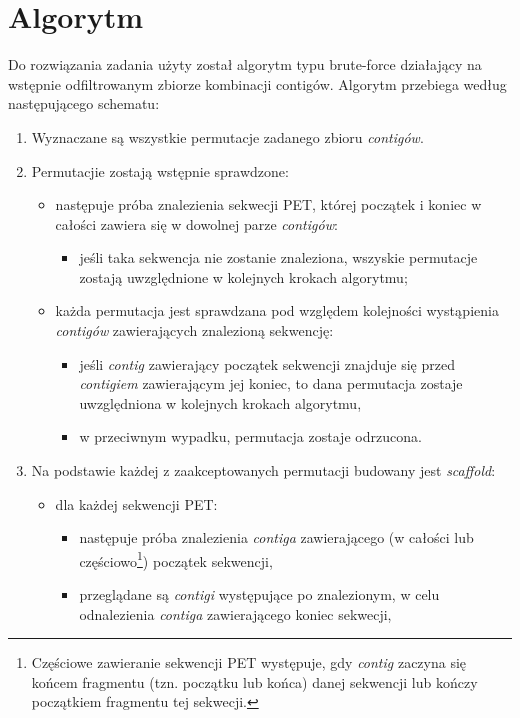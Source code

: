\documentclass[a4paper,10pt]{article}
\begin{document}
\section*{Algorytm}

Do rozwiązania zadania użyty został algorytm typu brute-force działający na wstępnie odfiltrowanym zbiorze kombinacji contigów.
Algorytm przebiega według następującego schematu:

\begin{enumerate}
 \item Wyznaczane są wszystkie permutacje zadanego zbioru \emph{contigów}.
 \item Permutacjie zostają wstępnie sprawdzone:
  \begin{itemize}
   \item następuje próba znalezienia sekwecji PET, której początek i koniec w całości zawiera się w dowolnej parze \emph{contigów}:
    \begin{itemize}
     \item jeśli taka sekwencja nie zostanie znaleziona, wszyskie permutacje zostają uwzględnione w kolejnych krokach algorytmu;
    \end{itemize}
   \item każda permutacja jest sprawdzana pod względem kolejności wystąpienia \emph{contigów} zawierających znalezioną sekwencję:
    \begin{itemize}
     \item jeśli \emph{contig} zawierający początek sekwencji znajduje się przed \emph{contigiem} zawierającym jej koniec, to dana permutacja zostaje uwzględniona w kolejnych krokach algorytmu,
     \item w przeciwnym wypadku, permutacja zostaje odrzucona.
    \end{itemize}
  \end{itemize}
 \item Na podstawie każdej z zaakceptowanych permutacji budowany jest \emph{scaffold}:
  \begin{itemize}
   \item dla każdej sekwencji PET:
    \begin{itemize}
     \item następuje próba znalezienia \emph{contiga} zawierającego (w całości lub częściowo\footnote{Częściowe zawieranie sekwencji PET występuje, gdy \emph{contig} zaczyna się końcem fragmentu (tzn. początku lub końca) danej sekwencji lub kończy początkiem fragmentu tej sekwecji.}) początek sekwencji,
     \item przeglądane są \emph{contigi} występujące po znalezionym, w celu odnalezienia \emph{contiga} zawierającego koniec sekwecji,

\end{itemize}
\end{itemize}
\end{enumerate}
\end{document}
